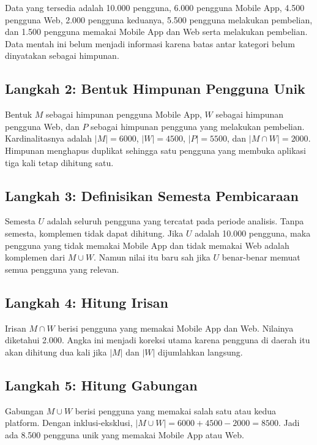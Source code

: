 \documentclass[11pt,a4paper]{article}
\begin{document}
Data yang tersedia adalah 10.000 pengguna, 6.000 pengguna Mobile App, 4.500 pengguna Web, 2.000 pengguna keduanya, 5.500 pengguna melakukan pembelian, dan 1.500 pengguna memakai Mobile App dan Web serta melakukan pembelian. Data mentah ini belum menjadi informasi karena batas antar kategori belum dinyatakan sebagai himpunan.

\subsection{Langkah 2: Bentuk Himpunan Pengguna Unik}

Bentuk $M$ sebagai himpunan pengguna Mobile App, $W$ sebagai himpunan pengguna Web, dan $P$ sebagai himpunan pengguna yang melakukan pembelian. Kardinalitasnya adalah $|M|=6000$, $|W|=4500$, $|P|=5500$, dan $|M \cap W|=2000$. Himpunan menghapus duplikat sehingga satu pengguna yang membuka aplikasi tiga kali tetap dihitung satu.

\subsection{Langkah 3: Definisikan Semesta Pembicaraan}

Semesta $U$ adalah seluruh pengguna yang tercatat pada periode analisis. Tanpa semesta, komplemen tidak dapat dihitung. Jika $U$ adalah 10.000 pengguna, maka pengguna yang tidak memakai Mobile App dan tidak memakai Web adalah komplemen dari $M \cup W$. Namun nilai itu baru sah jika $U$ benar-benar memuat semua pengguna yang relevan.

\subsection{Langkah 4: Hitung Irisan}

Irisan $M \cap W$ berisi pengguna yang memakai Mobile App dan Web. Nilainya diketahui 2.000. Angka ini menjadi koreksi utama karena pengguna di daerah itu akan dihitung dua kali jika $|M|$ dan $|W|$ dijumlahkan langsung.

\subsection{Langkah 5: Hitung Gabungan}

Gabungan $M \cup W$ berisi pengguna yang memakai salah satu atau kedua platform. Dengan inklusi-eksklusi, $|M \cup W|=6000+4500-2000=8500$. Jadi ada 8.500 pengguna unik yang memakai Mobile App atau Web.
\end{document}
